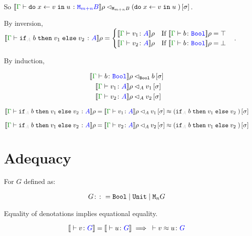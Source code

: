\documentclass{Report}
\begin{document}
So $\logRel{\deno{\gtyperelation{\doin{x}{v}{u}}{\M{m+n}{B}}}\rho}{\M{m+n}{B}}{(\doin{x}{v}{u})\ssi}$.



By inversion, $\deno{\gtyperelation{\pifthenelse{A}{b}{v_1}{v_2}}{A}}\rho = \begin{cases}
    \deno{\gtyperelation{v_1}{A}}\rho \qt{If }\deno{\gtyperelation{b}{\B}}\rho = \top\\
    \deno{\gtyperelation{v_2}{A}}\rho \qt{If }\deno{\gtyperelation{b}{\B}}\rho = \bot
\end{cases}
$.

By induction,

\begin{align}
    \logRel{\deno{\gtyperelation{b}{\B}&}\rho}{\B}{b\ssi}\\
    \logRel{\deno{\gtyperelation{v_1}{A}&}\rho}{A}{v_1\ssi}\\
    \logRel{\deno{\gtyperelation{v_2}{A}&}\rho}{A}{v_2\ssi}
\end{align}

    \begin{equation}
        \logRel{\deno{\gtyperelation{\pifthenelse{A}{b}{v_1}{v_2}}{A}}\rho = \deno{\gtyperelation{v_1}{A}}\rho}{A}{v_1\ssi\beequiv (\pifthenelse{A}{b}{v_1}{v_2})\ssi}
    \end{equation}

\begin{equation}
    \logRel{\deno{\gtyperelation{\pifthenelse{A}{b}{v_1}{v_2}}{A}}\rho = \deno{\gtyperelation{v_2}{A}}\rho}{A}{v_2\ssi\beequiv (\pifthenelse{A}{b}{v_1}{v_2})\ssi}
\end{equation}

\section{Adequacy}
\begin{theorem}[Adequacy]
For $G$ defined as:

\begin{align}
    G\colon\colon= \texttt{Bool} \mid \texttt{Unit} \mid \texttt{M}_{n}{G}
\end{align}

Equality of denotations implies equational equality.

\begin{equation}
    \deno{\ztyperelation{v}{G}} = \deno{\ztyperelation{u}{G}} \implies \zberelation{v}{u}{G}
\end{equation}

\end{theorem}
\end{document}
